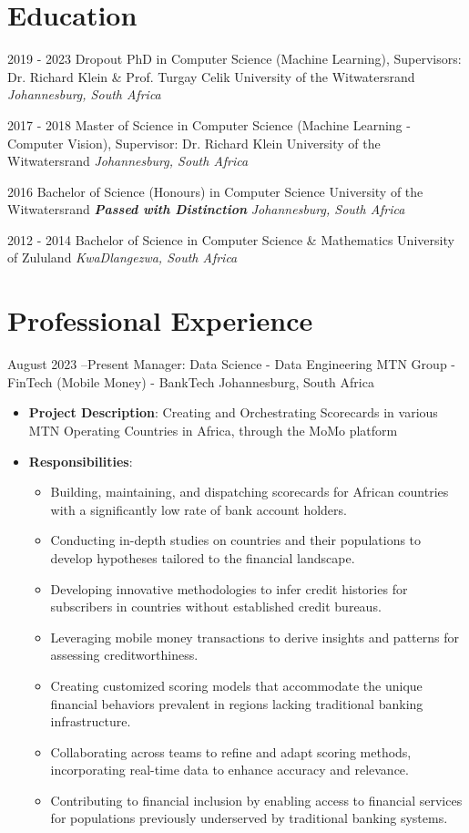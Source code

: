 \documentclass[11pt, letterpaper]{moderncv}        %
\begin{document}
\makecvtitle

\section{Education}
\cventry
{2019 - 2023 Dropout}
{PhD in Computer Science (Machine Learning), Supervisors: Dr. Richard Klein \& Prof. Turgay Celik}
{University of the Witwatersrand}
{}
{\textit{Johannesburg, South Africa}}
{}

\cventry
{2017 - 2018}
{Master of Science in Computer Science (Machine Learning - Computer Vision), Supervisor: Dr. Richard Klein}
{University of the Witwatersrand}
{}
{\textit{Johannesburg, South Africa}}
{}

\cventry
{2016}
{Bachelor of Science (Honours) in Computer Science}
{University of the Witwatersrand}
{\textbf{\textit{Passed with Distinction}}}
{\textit{Johannesburg, South Africa}}
{}

\cventry
{2012 - 2014}
{Bachelor of Science in Computer Science \& Mathematics}
{University of Zululand}
{}
{\textit{KwaDlangezwa, South Africa}}
{}


\section{Professional Experience}

\cventry
{August 2023 --Present}
{Manager: Data Science - Data Engineering}
{MTN Group - FinTech (Mobile Money) - BankTech}
{Johannesburg, South Africa}
{}
{\begin{itemize}%
		\item \textbf{Project Description}: Creating and Orchestrating Scorecards in various MTN Operating Countries in Africa, through the MoMo platform
		\item \textbf{Responsibilities}:
		\begin{itemize}
			\item Building, maintaining, and dispatching scorecards for African countries with a significantly low rate of bank account holders.
			\item Conducting in-depth studies on countries and their populations to develop hypotheses tailored to the financial landscape.
			\item Developing innovative methodologies to infer credit histories for subscribers in countries without established credit bureaus.
			\item Leveraging mobile money transactions to derive insights and patterns for assessing creditworthiness.
			\item Creating customized scoring models that accommodate the unique financial behaviors prevalent in regions lacking traditional banking infrastructure.
			\item Collaborating across teams to refine and adapt scoring methods, incorporating real-time data to enhance accuracy and relevance.
			\item Contributing to financial inclusion by enabling access to financial services for populations previously underserved by traditional banking systems.
		\end{itemize}
	\end{itemize}}
\end{document}
